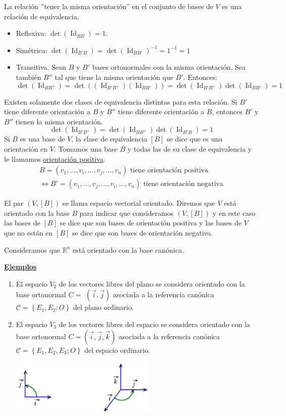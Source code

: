 \documentclass[12pt, a4paper, ones, notitlepage, openany,titlepage]{article}
\newcommand{\ejemplos}{\noindent\underline{\textbf{Ejemplos}}}
\begin{document}
La relación ''tener la misma orientación'' en el conjunto de bases de $V$ es una relación de equivalencia.
\begin{itemize}
	\item Reflexiva: $\det(\operatorname{Id}_{BB}) = 1$.
	\item Simétrica: $\det(\operatorname{Id}_{B'B}) = \det(\operatorname{Id}_{BB'})^{-1} = 1^{-1} = 1$
	\item Transitiva. Sean $B$ y $B'$ bases ortonormales con la misma orientación. Sea también $B''$ tal que tiene la misma orientación que $B'$. Entonces:
	$$
	\det(\operatorname{Id}_{BB''}) = \det((\operatorname{Id}_{B'B''})(\operatorname{Id}_{BB'})) = \det(\operatorname{Id}_{B'B''})\det(\operatorname{Id}_{BB'}) = 1
	$$ 
\end{itemize}
\noindent Existen solamente dos clases de equivalencia distintas para esta relación. Si $B'$ tiene diferente orientación a $B$ y $B''$ tiene diferente orientación a $B$, entonces $B'$ y $B''$ tienen la misma orientación.
$$
\det(\operatorname{Id}_{B'B''}) = \det(\operatorname{Id}_{BB''})\det(\operatorname{Id}_{B'B}) = 1
$$
Si $B$ es una base de $V$, la clase de equivalencia $[B]$ se dice que es una orientación en $V$. Tomamos una base $B$ y todas las de su clase de equivalencia y le llamamos \underline{orientación positiva}.
\begin{gather*}
	B = (v_1,\ldots,v_i,\ldots,v_j,\ldots,v_n) \text{ tiene orientación positiva} \\
	\Longleftrightarrow B' = (v_1,\ldots,v_j,\ldots,v_i,\ldots,v_n) \text{ tiene orientación negativa}
\end{gather*}

El par $(V,[B])$ se llama espacio vectorial orientado. Diremos que $V$ está orientado con la base $B$ para indicar que consideramos $(V,[B])$ y en este caso las bases de $[B]$ se dice que son bases de orientación positiva y las bases de $V$ que no están en $[B]$ se dice que son bases de orientación negativa.

Consideramos que $\mathbb{R}^{n}$ está orientado con la base canónica.

\ejemplos
\begin{enumerate}[label=(\arabic*)]
	\item El espacio $V_{2}$ de los vectores libres del plano se considera orientado con la base ortonormal $C=$ $(\vec{i}, \vec{j})$ asociada a la referencia canónica $\mathcal{C}=\left\{E_{1}, E_{2} ; O\right\}$ del plano ordinario.
	
	\item El espacio $V_{3}$ de los vectores libres del espacio se considera orientado con la base ortonormal $C=(\vec{i}, \vec{j}, \vec{k})$ asociada a la referencia canónica $\mathcal{C}=\left\{E_{1}, E_{2}, E_{3} ; O\right\}$ del espacio ordinario.
	
	\includegraphics[max width=7cm, center]{2023_03_20_c2fe6c117849a1a0e8afg-057}
\end{enumerate}
\end{document}
